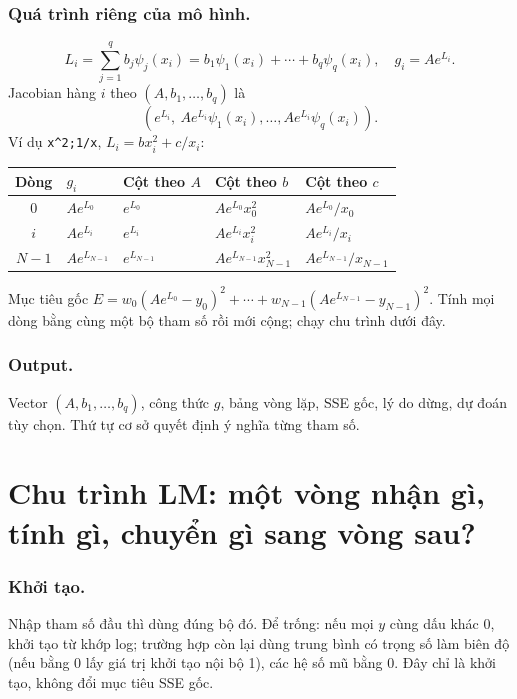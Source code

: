 \subsubsection*{Quá trình riêng của mô hình.}
\[
L_i=\sum_{j=1}^qb_j\psi_j(x_i)=b_1\psi_1(x_i)+\cdots+b_q\psi_q(x_i),\quad g_i=Ae^{L_i}.
\]
Jacobian hàng $i$ theo $(A,b_1,\ldots,b_q)$ là
\[
(e^{L_i},\ Ae^{L_i}\psi_1(x_i),\ldots,Ae^{L_i}\psi_q(x_i)).
\]
Ví dụ \texttt{x\^{}2;1/x}, $L_i=bx_i^2+c/x_i$:
\begin{center}\small\begin{tabular}{cllll}\toprule
Dòng&$g_i$&Cột theo $A$&Cột theo $b$&Cột theo $c$\\\midrule
0&$Ae^{L_0}$&$e^{L_0}$&$Ae^{L_0}x_0^2$&$Ae^{L_0}/x_0$\\
$i$&$Ae^{L_i}$&$e^{L_i}$&$Ae^{L_i}x_i^2$&$Ae^{L_i}/x_i$\\
$N-1$&$Ae^{L_{N-1}}$&$e^{L_{N-1}}$&$Ae^{L_{N-1}}x_{N-1}^2$&$Ae^{L_{N-1}}/x_{N-1}$\\\bottomrule
\end{tabular}\end{center}
Mục tiêu gốc $E=w_0(Ae^{L_0}-y_0)^2+\cdots+w_{N-1}(Ae^{L_{N-1}}-y_{N-1})^2$. Tính mọi dòng bằng cùng một bộ tham số rồi mới cộng; chạy chu trình dưới đây.
\subsubsection*{Output.} Vector $(A,b_1,\ldots,b_q)$, công thức $g$, bảng vòng lặp, SSE gốc, lý do dừng, dự đoán tùy chọn. Thứ tự cơ sở quyết định ý nghĩa từng tham số.

\examplebreak
\section{Chu trình LM: một vòng nhận gì, tính gì, chuyển gì sang vòng sau?}
\label{sec:ls-lm-tool}
\subsubsection*{Khởi tạo.} Nhập tham số đầu thì dùng đúng bộ đó. Để trống: nếu mọi $y$ cùng dấu khác 0, khởi tạo từ khớp log; trường hợp còn lại dùng trung bình có trọng số làm biên độ (nếu bằng 0 lấy giá trị khởi tạo nội bộ 1), các hệ số mũ bằng 0. Đây chỉ là khởi tạo, không đổi mục tiêu SSE gốc.

